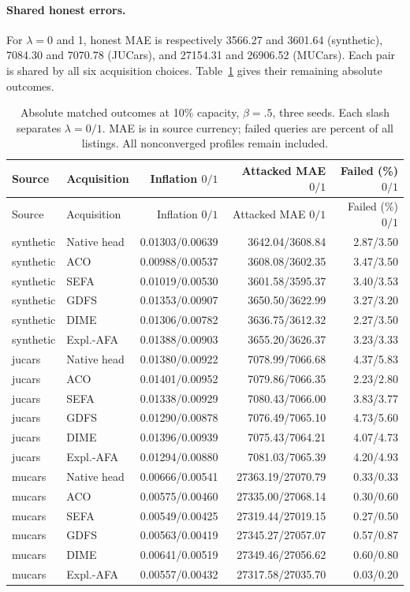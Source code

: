 \paragraph{Shared honest errors.}
For $\lambda=0$ and 1, honest MAE is respectively 3566.27 and 3601.64 (synthetic), 7084.30 and 7070.78 (JUCars), and 27154.31 and 26906.52 (MUCars). Each pair is shared by all six acquisition choices. Table~\ref{tab:recent_primary} gives their remaining absolute outcomes.
\setlength{\LTcapwidth}{\textwidth}
\setlength{\tabcolsep}{4pt}
\begin{longtable}{llrrr}
\caption{Absolute matched outcomes at 10\% capacity, $\beta=.5$, three seeds. Each slash separates $\lambda=0/1$. MAE is in source currency; failed queries are percent of all listings. All nonconverged profiles remain included.}\label{tab:recent_primary}\\
\toprule Source & Acquisition & Inflation $0/1$ & Attacked MAE $0/1$ & Failed (\%) $0/1$\\\midrule\endfirsthead
\toprule Source & Acquisition & Inflation $0/1$ & Attacked MAE $0/1$ & Failed (\%) $0/1$\\\midrule\endhead
synthetic & Native head & 0.01303/0.00639 & 3642.04/3608.84 & 2.87/3.50\\
synthetic & ACO & 0.00988/0.00537 & 3608.08/3602.35 & 3.47/3.50\\
synthetic & SEFA & 0.01019/0.00530 & 3601.58/3595.37 & 3.40/3.53\\
synthetic & GDFS & 0.01353/0.00907 & 3650.50/3622.99 & 3.27/3.20\\
synthetic & DIME & 0.01306/0.00782 & 3636.75/3612.32 & 2.27/3.50\\
synthetic & Expl.-AFA & 0.01388/0.00903 & 3655.20/3626.37 & 3.23/3.33\\
\midrule
jucars & Native head & 0.01380/0.00922 & 7078.99/7066.68 & 4.37/5.83\\
jucars & ACO & 0.01401/0.00952 & 7079.86/7066.35 & 2.23/2.80\\
jucars & SEFA & 0.01338/0.00929 & 7080.43/7066.00 & 3.83/3.77\\
jucars & GDFS & 0.01290/0.00878 & 7076.49/7065.10 & 4.73/5.60\\
jucars & DIME & 0.01396/0.00939 & 7075.43/7064.21 & 4.07/4.73\\
jucars & Expl.-AFA & 0.01294/0.00880 & 7081.03/7065.39 & 4.20/4.93\\
\midrule
mucars & Native head & 0.00666/0.00541 & 27363.19/27070.79 & 0.33/0.33\\
mucars & ACO & 0.00575/0.00460 & 27335.00/27068.14 & 0.30/0.60\\
mucars & SEFA & 0.00549/0.00425 & 27319.44/27019.15 & 0.27/0.50\\
mucars & GDFS & 0.00563/0.00419 & 27345.27/27057.07 & 0.57/0.87\\
mucars & DIME & 0.00641/0.00519 & 27349.46/27056.62 & 0.60/0.80\\
mucars & Expl.-AFA & 0.00557/0.00432 & 27317.58/27035.70 & 0.03/0.20\\
\bottomrule\end{longtable}
